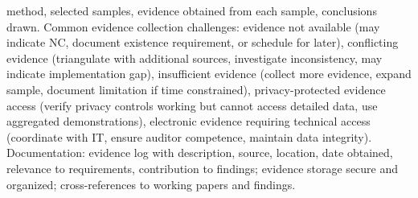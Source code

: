 \documentclass[11pt,a4paper]{article}
\begin{document}
method, selected samples, evidence obtained from each sample, conclusions drawn. Common evidence collection challenges: evidence not available (may indicate NC, document existence requirement, or schedule for later), conflicting evidence (triangulate with additional sources, investigate inconsistency, may indicate implementation gap), insufficient evidence (collect more evidence, expand sample, document limitation if time constrained), privacy-protected evidence access (verify privacy controls working but cannot access detailed data, use aggregated demonstrations), electronic evidence requiring technical access (coordinate with IT, ensure auditor competence, maintain data integrity). Documentation: evidence log with description, source, location, date obtained, relevance to requirements, contribution to findings; evidence storage secure and organized; cross-references to working papers and findings.
\end{document}
